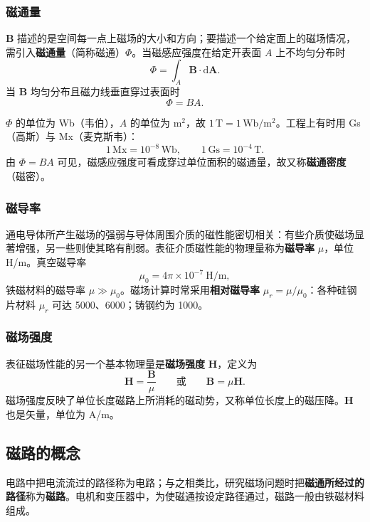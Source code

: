 \subsubsection{磁通量}
$\boldsymbol{B}$ 描述的是空间每一点上磁场的大小和方向；要描述一个给定面上的磁场情况，需引入\textbf{磁通量}（简称磁通）$\Phi$。当磁感应强度在给定开表面 $A$ 上不均匀分布时
\begin{equation}
\Phi=\int_{A}\boldsymbol{B}\cdot \mathrm{d}\boldsymbol{A}.
\end{equation}
当 $\boldsymbol{B}$ 均匀分布且磁力线垂直穿过表面时
\begin{equation}
\Phi=BA.
\end{equation}

$\Phi$ 的单位为 Wb（韦伯），$A$ 的单位为 $\mathrm{m^2}$，故 $1\,\mathrm{T}=1\,\mathrm{Wb/m^2}$。工程上有时用 Gs（高斯）与 Mx（麦克斯韦）：
\begin{equation}
1\,\mathrm{Mx}=10^{-8}\,\mathrm{Wb},\qquad 1\,\mathrm{Gs}=10^{-4}\,\mathrm{T}.
\end{equation}
由 $\Phi=BA$ 可见，磁感应强度可看成穿过单位面积的磁通量，故又称\textbf{磁通密度}（磁密）。

\subsubsection{磁导率}
通电导体所产生磁场的强弱与导体周围介质的磁性能密切相关：有些介质使磁场显著增强，另一些则使其略有削弱。表征介质磁性能的物理量称为\textbf{磁导率} $\mu$，单位 H/m。真空磁导率
\begin{equation}
\mu_0=4\pi\times10^{-7}\ \mathrm{H/m},
\end{equation}
铁磁材料的磁导率 $\mu\gg\mu_0$。磁场计算时常采用\textbf{相对磁导率} $\mu_r=\mu/\mu_0$：各种硅钢片材料 $\mu_r$ 可达 5000、6000；铸钢约为 1000。

\subsubsection{磁场强度}
表征磁场性能的另一个基本物理量是\textbf{磁场强度} $\boldsymbol{H}$，定义为
\begin{equation}
\boldsymbol{H}=\frac{\boldsymbol{B}}{\mu}\qquad\text{或}\qquad \boldsymbol{B}=\mu\boldsymbol{H}.
\end{equation}
磁场强度反映了单位长度磁路上所消耗的磁动势，又称单位长度上的磁压降。$\boldsymbol{H}$ 也是矢量，单位为 A/m。

\subsection{磁路的概念}
电路中把电流流过的路径称为电路；与之相类比，研究磁场问题时把\textbf{磁通所经过的路径}称为\textbf{磁路}。电机和变压器中，为使磁通按设定路径通过，磁路一般由铁磁材料组成。

